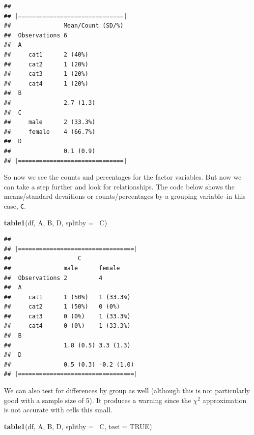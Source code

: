 \documentclass[]{tufte-book}
\newenvironment{Shaded}{}{}
\newcommand{\KeywordTok}[1]{\textcolor[rgb]{0.00,0.44,0.13}{\textbf{#1}}}
\newcommand{\DataTypeTok}[1]{\textcolor[rgb]{0.56,0.13,0.00}{#1}}
\newcommand{\OtherTok}[1]{\textcolor[rgb]{0.00,0.44,0.13}{#1}}
\newcommand{\OperatorTok}[1]{\textcolor[rgb]{0.40,0.40,0.40}{#1}}
\newcommand{\NormalTok}[1]{#1}
\theoremstyle{definition}
\theoremstyle{definition}
\theoremstyle{remark}
\begin{document}
\begin{verbatim}
## 
## |==============================|
##               Mean/Count (SD/%)
##  Observations 6                
##  A                             
##     cat1      2 (40%)          
##     cat2      1 (20%)          
##     cat3      1 (20%)          
##     cat4      1 (20%)          
##  B                             
##               2.7 (1.3)        
##  C                             
##     male      2 (33.3%)        
##     female    4 (66.7%)        
##  D                             
##               0.1 (0.9)        
## |==============================|
\end{verbatim}

So now we see the counts and percentages for the factor variables. But
now we can take a step further and look for relationships. The code
below shows the means/standard devaitions or counts/percentages by a
grouping variable--in this case, \texttt{C}.

\begin{Shaded}
\begin{Highlighting}[]
\KeywordTok{table1}\NormalTok{(df, A, B, D, }\DataTypeTok{splitby =} \OperatorTok{~}\NormalTok{C)}
\end{Highlighting}
\end{Shaded}

\begin{verbatim}
## 
## |=================================|
##                   C 
##               male      female    
##  Observations 2         4         
##  A                                
##     cat1      1 (50%)   1 (33.3%) 
##     cat2      1 (50%)   0 (0%)    
##     cat3      0 (0%)    1 (33.3%) 
##     cat4      0 (0%)    1 (33.3%) 
##  B                                
##               1.8 (0.5) 3.3 (1.3) 
##  D                                
##               0.5 (0.3) -0.2 (1.0)
## |=================================|
\end{verbatim}

We can also test for differences by group as well (although this is not
particularly good with a sample size of 5). It produces a warning since
the \(\chi^2\) approximation is not accurate with cells this small.

\begin{Shaded}
\begin{Highlighting}[]
\KeywordTok{table1}\NormalTok{(df, A, B, D, }\DataTypeTok{splitby =} \OperatorTok{~}\NormalTok{C, }\DataTypeTok{test =} \OtherTok{TRUE}\NormalTok{)}
\end{Highlighting}
\end{Shaded}
\end{document}
